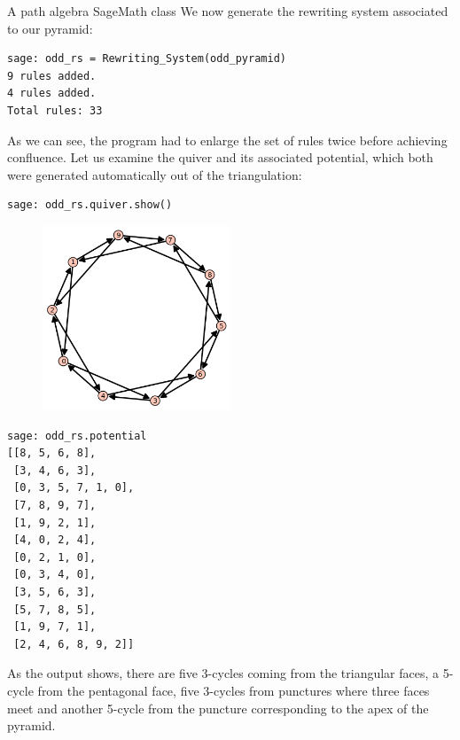 \begin{chapter}{A path algebra SageMath class}
We now generate the rewriting system associated to our pyramid:
\begin{lstlisting}
sage: odd_rs = Rewriting_System(odd_pyramid)
9 rules added.
4 rules added.
Total rules: 33
\end{lstlisting}
As we can see, the program had to enlarge the set of rules twice before achieving confluence. Let us examine the quiver and its associated potential, which both were generated automatically out of the triangulation:
\begin{lstlisting}
sage: odd_rs.quiver.show()
\end{lstlisting}
\begin{figure}[h]
\centering
\includegraphics[width=0.5\textwidth]{odd_quiver.png}
\end{figure}
\begin{lstlisting}
sage: odd_rs.potential
[[8, 5, 6, 8],
 [3, 4, 6, 3],
 [0, 3, 5, 7, 1, 0],
 [7, 8, 9, 7],
 [1, 9, 2, 1],
 [4, 0, 2, 4],
 [0, 2, 1, 0],
 [0, 3, 4, 0],
 [3, 5, 6, 3],
 [5, 7, 8, 5],
 [1, 9, 7, 1],
 [2, 4, 6, 8, 9, 2]]
\end{lstlisting}
As the output shows, there are five 3-cycles coming from the triangular faces, a 5-cycle from the pentagonal face, five 3-cycles from punctures where three faces meet and another 5-cycle from the puncture corresponding to the apex of the pyramid.


\end{chapter}
